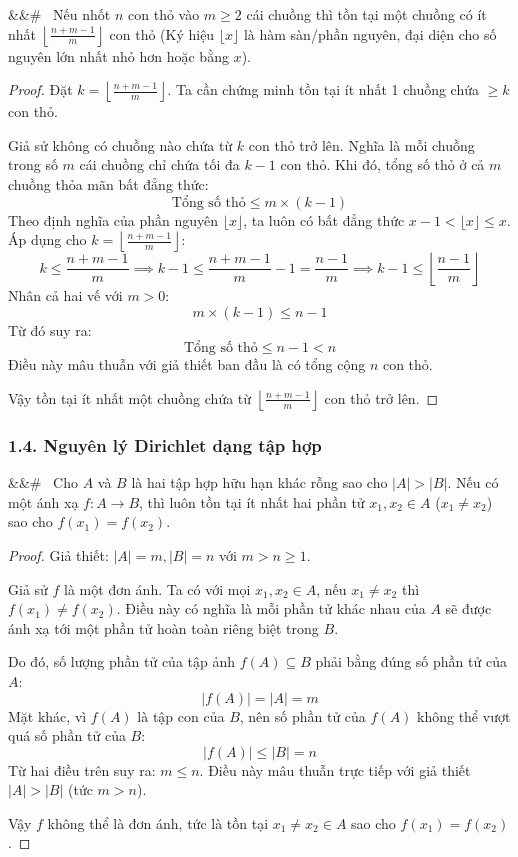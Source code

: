 \documentclass[12pt,a4paper]{article}
\newenvironment{mytheorem}[1][]
  {\begin{mdframed}[style=theoremstyle]\noindent\ifx&#1&#\else\textbf{#1}\ \fi\ignorespaces}
  {\end{mdframed}}
\theoremstyle{definition}
\begin{document}
\begin{mytheorem}
Nếu nhốt $n$ con thỏ vào $m \ge 2$ cái chuồng thì tồn tại một chuồng có ít nhất $\left\lfloor \frac{n + m - 1}{m} \right\rfloor$ con thỏ (Ký hiệu $\lfloor x \rfloor$ là hàm sàn/phần nguyên, đại diện cho số nguyên lớn nhất nhỏ hơn hoặc bằng $x$).
\end{mytheorem}

\begin{proof}
Đặt $k = \left\lfloor \frac{n + m - 1}{m} \right\rfloor$. Ta cần chứng minh tồn tại ít nhất 1 chuồng chứa $\ge k$ con thỏ.

\noindent Giả sử không có chuồng nào chứa từ $k$ con thỏ trở lên. Nghĩa là mỗi chuồng trong số $m$ cái chuồng chỉ chứa tối đa $k-1$ con thỏ. Khi đó, tổng số thỏ ở cả $m$ chuồng thỏa mãn bất đẳng thức:
\[
\text{Tổng số thỏ} \le m \times (k - 1)
\]
Theo định nghĩa của phần nguyên $\lfloor x \rfloor$, ta luôn có bất đẳng thức $x - 1 < \lfloor x \rfloor \le x$. Áp dụng cho $k = \left\lfloor \frac{n + m - 1}{m} \right\rfloor$:
\[
k \le \frac{n + m - 1}{m} \implies k - 1 \le \frac{n + m - 1}{m} - 1 = \frac{n - 1}{m} \implies k - 1 \le \left\lfloor \frac{n - 1}{m} \right\rfloor
\]
Nhân cả hai vế với $m > 0$:
\[
m \times (k - 1) \le n - 1
\]
Từ đó suy ra:
\[
\text{Tổng số thỏ} \le n - 1 < n
\]
Điều này mâu thuẫn với giả thiết ban đầu là có tổng cộng $n$ con thỏ.

\noindent Vậy tồn tại ít nhất một chuồng chứa từ $\left\lfloor \frac{n + m - 1}{m} \right\rfloor$ con thỏ trở lên.
\end{proof}

\subsubsection*{1.4. Nguyên lý Dirichlet dạng tập hợp}

\begin{mytheorem}
Cho $A$ và $B$ là hai tập hợp hữu hạn khác rỗng sao cho $|A| > |B|$. Nếu có một ánh xạ $f: A \to B$, thì luôn tồn tại ít nhất hai phần tử $x_1, x_2 \in A$ ($x_1 \neq x_2$) sao cho $f(x_1) = f(x_2)$.
\end{mytheorem}

\begin{proof}
Giả thiết: $|A| = m, |B| = n$ với $m > n \ge 1$.

\noindent Giả sử $f$ là một đơn ánh. Ta có với mọi $x_1, x_2 \in A$, nếu $x_1 \neq x_2$ thì $f(x_1) \neq f(x_2)$. Điều này có nghĩa là mỗi phần tử khác nhau của $A$ sẽ được ánh xạ tới một phần tử hoàn toàn riêng biệt trong $B$.

\noindent Do đó, số lượng phần tử của tập ảnh $f(A) \subseteq B$ phải bằng đúng số phần tử của $A$:
\[
|f(A)| = |A| = m
\]
Mặt khác, vì $f(A)$ là tập con của $B$, nên số phần tử của $f(A)$ không thể vượt quá số phần tử của $B$:
\[
|f(A)| \le |B| = n
\]
Từ hai điều trên suy ra: $m \le n$. Điều này mâu thuẫn trực tiếp với giả thiết $|A| > |B|$ (tức $m > n$).

\noindent Vậy $f$ không thể là đơn ánh, tức là tồn tại $x_1 \neq x_2 \in A$ sao cho $f(x_1) = f(x_2)$.
\end{proof}
\end{document}
